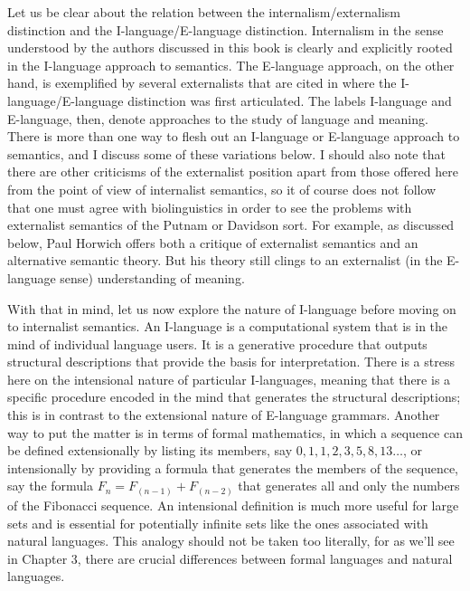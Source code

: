 Let us be clear about the relation between the internalism/externalism distinction and the I-language/E-language distinction. Internalism in the sense understood by the authors discussed in this book is clearly and explicitly rooted in the I-language approach to semantics. The E-language approach, on the other hand, is exemplified by several externalists that are cited in \citet{Chomsky1986} where the I-language/E-language distinction was first articulated. The labels I-language and E-language, then, denote approaches to the study of language and meaning. There is more than one way to flesh out an I-language or E-language approach to semantics, and I discuss some of these variations below. I should also note that there are other criticisms of the externalist position apart from those offered here from the point of view of internalist semantics, so it of course does not follow that one must agree with biolinguistics in order to see the problems with externalist semantics of the Putnam or Davidson sort. For example, as discussed below, Paul Horwich offers both a critique of externalist semantics and an alternative semantic theory. But his theory still clings to an externalist (in the E-language sense) understanding of meaning. 

With that in mind, let us now explore the nature of I-language before moving on to internalist semantics. An I-language is a computational system that is in the mind of individual language users. It is a generative procedure that outputs structural descriptions that provide the basis for interpretation. There is a stress here on the intensional nature of particular I-languages, meaning that there is a specific procedure encoded in the mind that generates the structural descriptions; this is in contrast to the extensional nature of E-language grammars. Another way to put the matter is in terms of formal mathematics, in which a sequence can be defined extensionally by listing its members, say ${0, 1, 1, 2, 3, 5, 8, 13…}$, or intensionally by providing a formula that generates the members of the sequence, say the formula $F_n = F_{(n-1)} + F_{(n-2)}$ that generates all and only the numbers of the Fibonacci sequence. An intensional definition is much more useful for large sets and is essential for potentially infinite sets like the ones associated with natural languages. This analogy should not be taken too literally, for as we'll see in Chapter 3, there are crucial differences between formal languages and natural languages.

